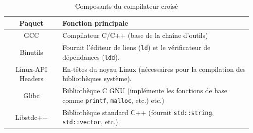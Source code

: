 \begin{table}[H]
    \centering
    \begin{tabular}{|c|p{8cm}|}
        \hline
        \textbf{Paquet}  & \textbf{Fonction principale} \\
        \hline
       GCC                & Compilateur C/C++ (base de la chaîne d’outils) \\
        \hline
        Binutils             & Fournit l’éditeur de liens (\texttt{ld}) et le vérificateur de dépendances (\texttt{ldd}). \\
        \hline
        Linux-API Headers         &   En-têtes du noyau Linux (nécessaires pour la compilation des bibliothèques système). \\
        \hline
        Glibc          & Bibliothèque C GNU (implémente les fonctions de base comme \texttt{printf}, \texttt{malloc}, etc.) etc.) \\
        \hline
        Libstdc++       & Bibliothèque standard C++ (fournit \texttt{std::string}, \texttt{std::vector}, etc.). \\
       
       
        \hline
    \end{tabular}
    \caption{Composants du compilateur croisé}
    \label{tab:crosscompiler}
\end{table}

       
